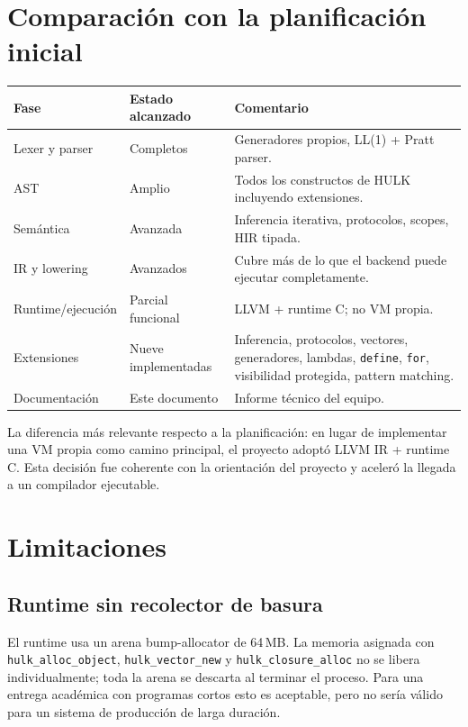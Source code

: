 \documentclass[12pt,letterpaper]{article}
\newcommand{\hulk}{\textsc{HULK}}
\newcommand{\src}[1]{\texttt{#1}}
\begin{document}
\section{Comparación con la planificación inicial}

\begin{longtable}{p{3.4cm}p{5.0cm}p{5.8cm}}
\toprule
\textbf{Fase} & \textbf{Estado alcanzado} & \textbf{Comentario} \\
\midrule
Lexer y parser & Completos & Generadores propios, LL(1) + Pratt parser. \\
AST & Amplio & Todos los constructos de \hulk{} incluyendo extensiones. \\
Semántica & Avanzada & Inferencia iterativa, protocolos, scopes, HIR tipada. \\
IR y lowering & Avanzados & Cubre más de lo que el backend puede ejecutar completamente. \\
Runtime/ejecución & Parcial funcional & LLVM + runtime C; no VM propia. \\
Extensiones & Nueve implementadas & Inferencia, protocolos, vectores, generadores, lambdas, \src{define}, \src{for}, visibilidad protegida, pattern matching. \\
Documentación & Este documento & Informe técnico del equipo. \\
\bottomrule
\end{longtable}

La diferencia más relevante respecto a la planificación: en lugar de implementar una VM propia como camino principal, el proyecto adoptó LLVM IR + runtime C. Esta decisión fue coherente con la orientación del proyecto y aceleró la llegada a un compilador ejecutable.

\section{Limitaciones}

\subsection{Runtime sin recolector de basura}

El runtime usa un arena bump-allocator de 64\,MB. La memoria asignada con \src{hulk\_alloc\_object}, \src{hulk\_vector\_new} y \src{hulk\_closure\_alloc} no se libera individualmente; toda la arena se descarta al terminar el proceso. Para una entrega académica con programas cortos esto es aceptable, pero no sería válido para un sistema de producción de larga duración.
\end{document}
